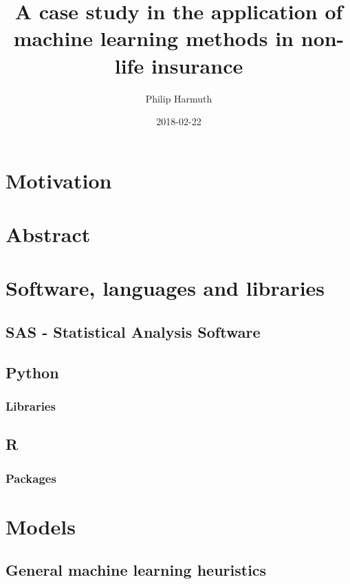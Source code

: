 \documentclass[]{article}
\title{A case study in the application of machine learning methods in non-life
insurance}
\author{Philip Harmuth}
\date{2018-02-22}
\begin{document}
\maketitle

{
\setcounter{tocdepth}{2}
\tableofcontents
}
\section{Motivation}\label{motivation}

\section{Abstract}\label{abstract}

\citet{xie2015}

\section{Software, languages and
libraries}\label{software-languages-and-libraries}

\subsection{SAS - Statistical Analysis
Software}\label{sas---statistical-analysis-software}

\subsection{Python}\label{python}

\subsubsection{Libraries}\label{libraries}

\subsection{R}\label{r}

\subsubsection{Packages}\label{packages}

\section{Models}\label{models}

\subsection{General machine learning
heuristics}\label{general-machine-learning-heuristics}
\end{document}
